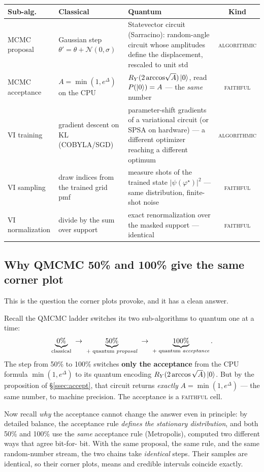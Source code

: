 \documentclass[11pt]{article}
\newcommand{\KL}{\mathrm{KL}}
\newcommand{\faithful}{\textsc{faithful}}
\newcommand{\algorithmic}{\textsc{algorithmic}}
\begin{document}
\begin{center}
\footnotesize
\begin{longtable}{@{}p{2.1cm}p{4.3cm}p{4.6cm}c@{}}
\toprule
\textbf{Sub-alg.} & \textbf{Classical} & \textbf{Quantum} & \textbf{Kind}\\
\midrule
\endhead
MCMC proposal & Gaussian step $\theta'=\theta+\mathcal N(0,\sigma)$ &
Statevector circuit (Sarracino): random-angle circuit whose amplitudes define
the displacement, rescaled to unit std & \algorithmic\\[4pt]
MCMC acceptance & $A=\min(1,e^\Delta)$ on the CPU &
$R_Y(2\arccos\!\sqrt{A})\ket0$, read $P(\ket0)=A$ --- the \emph{same} number &
\faithful\\[4pt]
VI training & gradient descent on $\KL$ (COBYLA/SGD) &
parameter-shift gradients of a variational circuit (or SPSA on hardware) ---
a different optimizer reaching a different optimum & \algorithmic\\[4pt]
VI sampling & draw indices from the trained grid pmf &
measure shots of the trained state $|\psi(\varphi^\star)|^2$ --- same
distribution, finite-shot noise & \faithful\\[4pt]
VI normalization & divide by the sum over support &
exact renormalization over the masked support --- identical & \faithful\\
\bottomrule
\end{longtable}
\end{center}

\subsection{Why QMCMC 50\% and 100\% give the same corner plot}
\label{ssec:why5050}

This is the question the corner plots provoke, and it has a clean answer.

Recall the QMCMC ladder switches its two sub-algorithms to quantum one at a
time:
\[
\underbrace{0\%}_{\text{classical}}
\;\to\;
\underbrace{50\%}_{\text{+ quantum \emph{proposal}}}
\;\to\;
\underbrace{100\%}_{\text{+ quantum \emph{acceptance}}}.
\]
The step from 50\% to 100\% switches \textbf{only the acceptance} from the CPU
formula $\min(1,e^\Delta)$ to its quantum encoding $R_Y(2\arccos\sqrt A)\ket0$.
But by the proposition of \S\ref{ssec:accept}, that circuit returns
\emph{exactly} $A=\min(1,e^\Delta)$ --- the same number, to machine precision.
The acceptance is a \faithful{} cell.

Now recall \emph{why} the acceptance cannot change the answer even in
principle: by detailed balance, the acceptance rule \emph{defines the
stationary distribution}, and both 50\% and 100\% use the \emph{same}
acceptance rule (Metropolis), computed two different ways that agree bit-for-
bit. With the same proposal, the same rule, and the same random-number stream,
the two chains take \emph{identical} steps. Their samples are identical, so
their corner plots, means and credible intervals coincide exactly.
\end{document}
